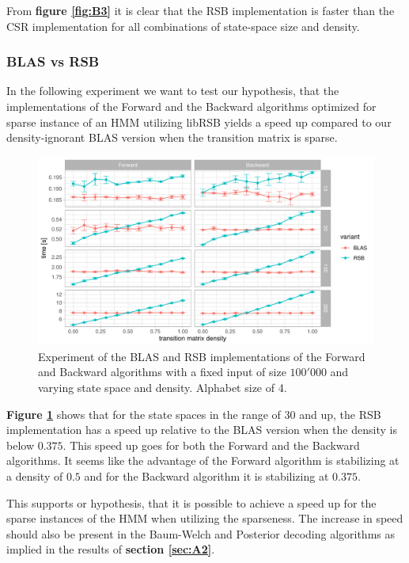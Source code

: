 From \textbf{figure \ref{fig:B3}} it is clear that the RSB implementation is faster than the CSR implementation for all combinations of state-space size and density.

\subsubsection{BLAS vs RSB}\label{sec:B1}

In the following experiment we want to test our hypothesis, that the implementations of the Forward and the Backward algorithms optimized for sparse instance of an HMM utilizing libRSB yields a speed up compared to our density-ignorant BLAS version when the transition matrix is sparse.

\begin{figure}[H]
  \centering
  \includegraphics[scale=0.85]{figures/figure_B1.pdf}
  \caption{\small{Experiment of the BLAS and RSB implementations of the Forward and Backward algorithms with a fixed input of size $100'000$ and varying state space and density. Alphabet size of 4.}}
  \label{fig:B1}
\end{figure}

\textbf{Figure \ref{fig:B1}} shows that for the state spaces in the range of $30$ and up, the RSB implementation has a speed up relative to the BLAS version when the density is below $0.375$. This speed up goes for both the Forward and the Backward algorithms. It seems like the advantage of the Forward algorithm is stabilizing at a density of $0.5$ and for the Backward algorithm it is stabilizing at $0.375$.

This supports or hypothesis, that it is possible to achieve a speed up for the sparse instances of the HMM when utilizing the sparseness. 
The increase in speed should also be present in the Baum-Welch and Posterior decoding algorithms as implied in the results of \textbf{section \ref{sec:A2}}.

